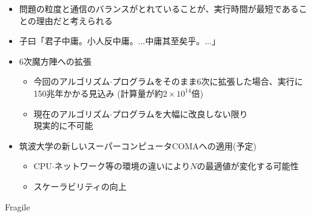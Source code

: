 \documentclass[a4paper,landscape,25pt]{foils}
\begin{document}
\begin{itemize}
\item 問題の粒度と通信のバランスがとれていることが、実行時間が最短であることの理由だと考えられる
\item 子曰「君子中庸。小人反中庸。...中庸其至矣乎。...」
\end{itemize}

\begin{itemize}
\item 6次魔方陣への拡張
\begin{itemize}
\item 今回のアルゴリズム$\cdot$プログラムをそのまま6次に拡張した場合、実行に150兆年かかる見込み
(計算量が約$2\times10^{14}$倍)
\item 現在のアルゴリズム$\cdot$プログラムを大幅に改良しない限り \\ 現実的に不可能
\end{itemize}
\item 筑波大学の新しいスーパーコンピュータCOMAへの適用(予定)
\begin{itemize}
\item CPU$\cdot$ネットワーク等の環境の違いにより$N$の最適値が変化する可能性
\item スケーラビリティの向上
\end{itemize}
\end{itemize}

Fragile
\end{document}
